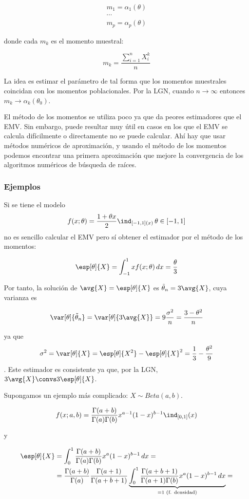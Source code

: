 \documentclass{apuntes}
\begin{document}
\begin{gather*}
m_1 = \alpha_1(\theta) \\
\dotsb \\
m_p = \alpha_p(\theta) 
\end{gather*}

donde cada $m_k$ es el momento muestral:

\[ m_k = \frac{\sum_{i=1}^n X_i^k}{n} \]

La idea es estimar el parámetro de tal forma que los momentos muestrales coincidan con los momentos poblacionales. Por la LGN, cuando $n\to\infty$ entonces $m_k \to \alpha_k(\theta_0)$. 

El método de los momentos se utiliza poco ya que da peores estimadores que el EMV. Sin embargo, puede resultar muy útil en casos en los que el EMV se calcula difícilmente o directamente no se puede calcular. Ahí hay que usar métodos numéricos de aproximación, y usando el método de los momentos podemos encontrar una primera aproximación que mejore la convergencia de los algoritmos numéricos de búsqueda de raíces.

\subsubsection{Ejemplos}

Si se tiene el modelo \[f(x;\theta) = \frac{1+\theta x}{2}\ind_{[-1,1](x)}\,\theta\in[-1,1] \] no es sencillo calcular el EMV pero sí obtener el estimador por el método de los momentos:

\[ \esp[\theta]{X} = \int_{-1}^1 x f(x;\theta)\,dx = \frac{\theta}{3} \]

Por tanto, la solución de $\avg{X} = \esp[\theta]{X}$ es $\tilde\theta_n = 3\avg{X}$, cuya varianza es 

\[ \var[\theta]{\tilde\theta_n} = \var[\theta]{3\avg{X}} = 9\frac{\sigma^2}{n} = \frac{3-\theta^2}{n} \]

ya que \[ \sigma^2 = \var[\theta]{X}= \esp[\theta]{X^2} - \esp[\theta]{X}^2 = \frac{1}{3}-\frac{\theta^2}{9} \]. Este estimador es consistente ya que, por la LGN, $3\avg{X} \convs 3\esp[\theta]{X}$.

Supongamos un ejemplo más complicado: $X\sim Beta(a,b)$.

\[ f(x;a,b) = \frac{\Gamma(a+b)}{\Gamma(a)\Gamma(b)} x^{a-1}(1-x)^{b-1} \ind_{[0,1]}(x) \]

y

\begin{align*}
\esp[\theta]{X} &= \int_0^1\frac{\Gamma(a+b)}{\Gamma(a)\Gamma(b)} x^{a}(1-x)^{b-1}\,dx = \\
&= \frac{\Gamma(a+b)}{\Gamma(a)}\frac{\Gamma(a+1)}{\Gamma(a+b+1)}\underbrace{\int_0^1\frac{\Gamma(a+b+1)}{\Gamma(a+1)\Gamma(b)} x^{a}(1-x)^{b-1}\,dx}_{=1 \text{ (f. densidad)}} = 
\end{align*}
\end{document}
